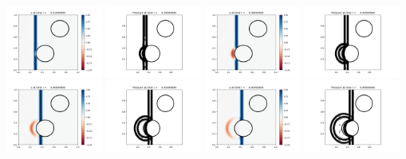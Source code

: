 \documentclass[11pt]{article}
\begin{document}
\includegraphics[width=0.2375\textwidth]{frame0007fig1.png}
\vskip 10pt 
\includegraphics[width=0.2375\textwidth]{frame0008fig0.png}
\includegraphics[width=0.2375\textwidth]{frame0008fig1.png}
\includegraphics[width=0.2375\textwidth]{frame0009fig0.png}
\includegraphics[width=0.2375\textwidth]{frame0009fig1.png}
\vskip 10pt 
\includegraphics[width=0.2375\textwidth]{frame0010fig0.png}
\includegraphics[width=0.2375\textwidth]{frame0010fig1.png}
\includegraphics[width=0.2375\textwidth]{frame0011fig0.png}
\end{document}
